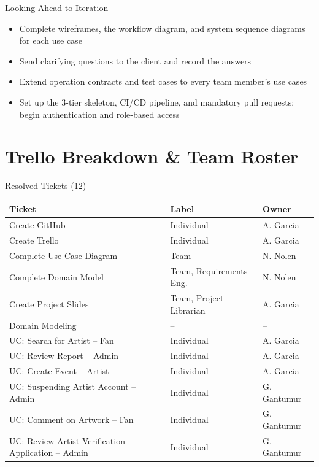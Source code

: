 \documentclass[11pt,aspectratio=169]{beamer}
\newcounter{nextIter}
\newcommand{\nextIteration}{\thenextIter}
\begin{document}
\begin{frame}{Looking Ahead to Iteration \nextIteration}
\begin{itemize}
  \item Complete wireframes, the workflow diagram, and system sequence diagrams for each use case
  \item Send clarifying questions to the client and record the answers
  \item Extend operation contracts and test cases to every team member's use cases
  \item Set up the 3-tier skeleton, CI/CD pipeline, and mandatory pull requests; begin authentication and role-based access
\end{itemize}
\end{frame}

\section{Trello Breakdown \& Team Roster}

\begin{frame}{Resolved Tickets (12)}
\footnotesize
\begin{tabular}{@{}lll@{}}
\toprule
Ticket & Label & Owner \\
\midrule
Create GitHub & Individual & A. Garcia \\
Create Trello & Individual & A. Garcia \\
Complete Use-Case Diagram & Team & N. Nolen \\
Complete Domain Model & Team, Requirements Eng. & N. Nolen \\
Create Project Slides & Team, Project Librarian & A. Garcia \\
Domain Modeling & -- & -- \\
UC: Search for Artist -- Fan & Individual & A. Garcia \\
UC: Review Report -- Admin & Individual & A. Garcia \\
UC: Create Event -- Artist & Individual & A. Garcia \\
UC: Suspending Artist Account -- Admin & Individual & G. Gantumur \\
UC: Comment on Artwork -- Fan & Individual & G. Gantumur \\
UC: Review Artist Verification Application -- Admin & Individual & G. Gantumur \\
\bottomrule
\end{tabular}
\end{frame}
\end{document}
